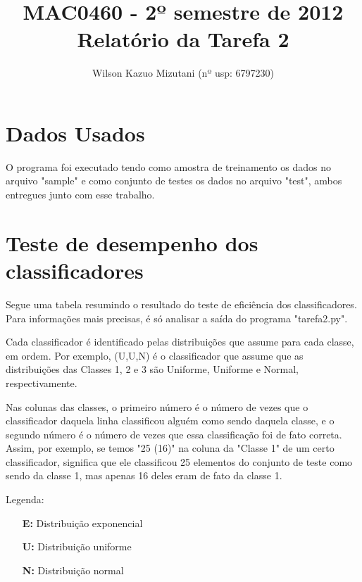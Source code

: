 \documentclass[a4paper,11pt]{article}
\title{MAC0460 - 2º semestre de 2012 \\ Relatório da Tarefa 2}
\author{Wilson Kazuo Mizutani (nº usp: 6797230)}
\begin{document}
\maketitle

\section{Dados Usados}

  O programa foi executado tendo como amostra de treinamento os dados no arquivo
  "sample" e como conjunto de testes os dados no arquivo "test", ambos entregues
  junto com esse trabalho.

\section{Teste de desempenho dos classificadores}

  Segue uma tabela resumindo o resultado do teste de eficiência dos
  classificadores. Para informações mais precisas, é só analisar a saída do
  programa "tarefa2.py".
  
  Cada classificador é identificado pelas distribuições que assume para cada
  classe, em ordem. Por exemplo, (U,U,N) é o classificador que assume que as
  distribuições das Classes 1, 2 e 3 são Uniforme, Uniforme e Normal,
  respectivamente. 
  
  Nas colunas das classes, o primeiro número é o número de vezes que o
  classificador daquela linha classificou alguém como sendo daquela classe, e o
  segundo número é o número de vezes que essa classificação foi de fato correta.
  Assim, por exemplo, se temos "25 (16)"\hspace{1pt} na coluna da "Classe 1"
  \hspace{1pt} de um certo classificador, significa que ele classificou 25
  elementos do conjunto de teste como sendo da classe 1, mas apenas 16 deles
  eram de fato da classe 1.
  
  Legenda:
    \begin{itemize}
      \item[\bf E:] { Distribuição exponencial }
      \item[\bf U:] { Distribuição uniforme }
      \item[\bf N:] { Distribuição normal }
    \end{itemize}
    
\end{document}
